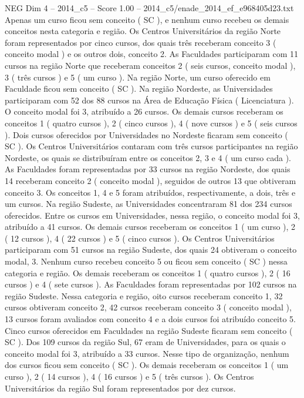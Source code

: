 \begin{textsample}{NEG Dim 4 – 2014\_c5 – Score 1.00 – 2014\_c5/enade\_2014\_ef\_e968405d23.txt}
Apenas um curso ficou sem conceito ( SC ), e nenhum curso recebeu os demais conceitos nesta categoria e região.
Os Centros Universitários da região Norte foram representados por cinco cursos, dos quais três receberam conceito 3 ( conceito modal ) e os outros dois, conceito 2.
As Faculdades participaram com 11 cursos na região Norte que receberam conceitos 2 ( seis cursos, conceito modal ), 3 ( três cursos ) e 5 ( um curso ).
Na região Norte, um curso oferecido em Faculdade ficou sem conceito ( SC ).
Na região Nordeste, as Universidades participaram com 52 dos 88 cursos na Área de Educação Física ( Licenciatura ).
O conceito modal foi 3, atribuído a 26 cursos.
Os demais cursos receberam os conceitos 1 ( quatro cursos ), 2 ( cinco cursos ), 4 ( nove cursos ) e 5 ( seis cursos ).
Dois cursos oferecidos por Universidades no Nordeste ficaram sem conceito ( SC ).
Os Centros Universitários contaram com três cursos participantes na região Nordeste, os quais se distribuíram entre os conceitos 2, 3 e 4 ( um curso cada ).
As Faculdades foram representadas por 33 cursos na região Nordeste, dos quais 14 receberam conceito 2 ( conceito modal ), seguidos de outros 13 que obtiveram conceito 3.
Os conceitos 1, 4 e 5 foram atribuídos, respectivamente, a dois, três e um cursos.
Na região Sudeste, as Universidades concentraram 81 dos 234 cursos oferecidos.
Entre os cursos em Universidades, nessa região, o conceito modal foi 3, atribuído a 41 cursos.
Os demais cursos receberam os conceitos 1 ( um curso ), 2 ( 12 cursos ), 4 ( 22 cursos ) e 5 ( cinco cursos ).
Os Centros Universitários participaram com 51 cursos na região Sudeste, dos quais 24 obtiveram o conceito modal, 3.
Nenhum curso recebeu conceito 5 ou ficou sem conceito ( SC ) nessa categoria e região.
Os demais receberam os conceitos 1 ( quatro cursos ), 2 ( 16 cursos ) e 4 ( sete cursos ).
As Faculdades foram representadas por 102 cursos na região Sudeste.
Nessa categoria e região, oito cursos receberam conceito 1, 32 cursos obtiveram conceito 2, 42 cursos receberam conceito 3 ( conceito modal ), 13 cursos foram avaliados com conceito 4 e a dois cursos foi atribuído conceito 5.
Cinco cursos oferecidos em Faculdades na região Sudeste ficaram sem conceito ( SC ).
Dos 109 cursos da região Sul, 67 eram de Universidades, para os quais o conceito modal foi 3, atribuído a 33 cursos.
Nesse tipo de organização, nenhum dos cursos ficou sem conceito ( SC ).
Os demais receberam os conceitos 1 ( um curso ), 2 ( 14 cursos ), 4 ( 16 cursos ) e 5 ( três cursos ).
Os Centros Universitários da região Sul foram representados por dez cursos.

\end{textsample}
